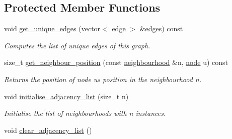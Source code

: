 \subsection*{Protected Member Functions}
\begin{DoxyCompactItemize}
\item 
void \hyperlink{classlgraph_1_1utils_1_1uugraph_abf90763a86587e8d45430fe224912cf6}{get\+\_\+unique\+\_\+edges} (vector$<$ \hyperlink{namespacelgraph_1_1utils_a6510284ce1b1ae5dc97ce5d2de426e10}{edge} $>$ \&\hyperlink{classlgraph_1_1utils_1_1uxgraph_ade877f3a9cf71d844cfe7b6c4f8aae10}{edges}) const 
\begin{DoxyCompactList}\small\item\em Computes the list of unique edges of this graph. \end{DoxyCompactList}\item 
size\+\_\+t \hyperlink{classlgraph_1_1utils_1_1xxgraph_aac7ef2134cad9529869f1334de7892d9}{get\+\_\+neighbour\+\_\+position} (const \hyperlink{namespacelgraph_1_1utils_a0f2ef47028a466d26841709e705390ac}{neighbourhood} \&n, \hyperlink{namespacelgraph_1_1utils_a7bd66ede3805ef121bc2835bd48de0cf}{node} u) const 
\begin{DoxyCompactList}\small\item\em Returns the position of node {\itshape u\textquotesingle{}s} position in the neighbourhood {\itshape n}. \end{DoxyCompactList}\item 
void \hyperlink{classlgraph_1_1utils_1_1xxgraph_a2201aaff5e9ffa29a9b3abfde705dd46}{initialise\+\_\+adjacency\+\_\+list} (size\+\_\+t n)\hypertarget{classlgraph_1_1utils_1_1xxgraph_a2201aaff5e9ffa29a9b3abfde705dd46}{}\label{classlgraph_1_1utils_1_1xxgraph_a2201aaff5e9ffa29a9b3abfde705dd46}

\begin{DoxyCompactList}\small\item\em Initialise the list of neighbourhoods with {\itshape n} instances. \end{DoxyCompactList}\item 
void \hyperlink{classlgraph_1_1utils_1_1xxgraph_a6523402d0ec66918b95de23d2bee38fc}{clear\+\_\+adjacency\+\_\+list} ()\hypertarget{classlgraph_1_1utils_1_1xxgraph_a6523402d0ec66918b95de23d2bee38fc}{}\label{classlgraph_1_1utils_1_1xxgraph_a6523402d0ec66918b95de23d2bee38fc}


\end{DoxyCompactItemize}
